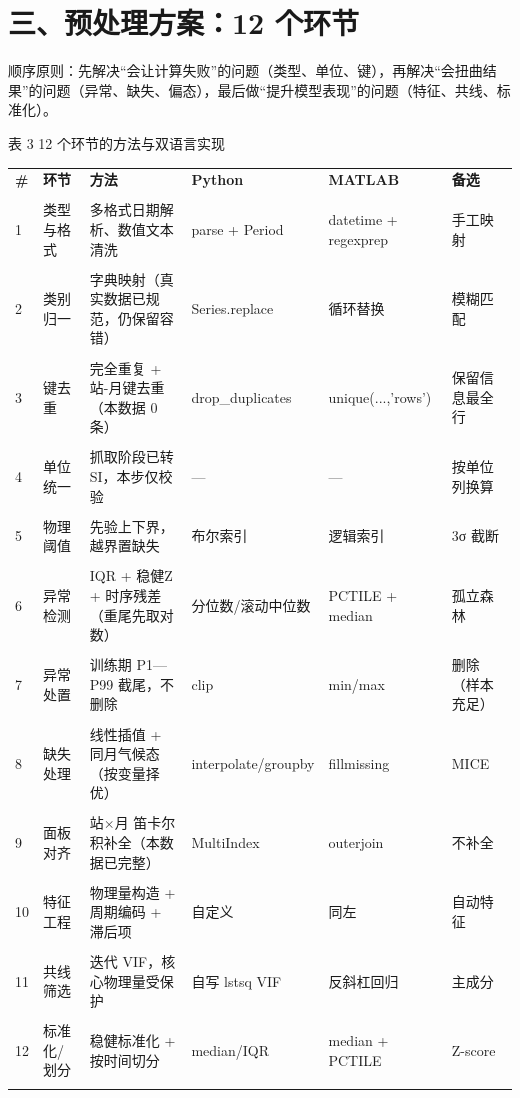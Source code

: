 \documentclass[11pt,a4paper]{ctexart}
\begin{document}
\section*{三、预处理方案：12 个环节}
顺序原则：先解决“会让计算失败”的问题（类型、单位、键），再解决“会扭曲结果”的问题（异常、缺失、偏态），最后做“提升模型表现”的问题（特征、共线、标准化）。

表 3  12 个环节的方法与双语言实现


\begin{table}[H]\centering\small\setlength{\parskip}{2pt}
\begin{tabularx}{\textwidth}{|X|X|X|X|X|X|}
\toprule
\textbf{\#} & \textbf{环节} & \textbf{方法} & \textbf{Python} & \textbf{MATLAB} & \textbf{备选} \\\\
\midrule
1 & 类型与格式 & 多格式日期解析、数值文本清洗 & parse + Period & datetime + regexprep & 手工映射 \\\\
2 & 类别归一 & 字典映射（真实数据已规范，仍保留容错） & Series.replace & 循环替换 & 模糊匹配 \\\\
3 & 键去重 & 完全重复 + 站-月键去重（本数据 0 条） & drop\_duplicates & unique(...,'rows') & 保留信息最全行 \\\\
4 & 单位统一 & 抓取阶段已转 SI，本步仅校验 & — & — & 按单位列换算 \\\\
5 & 物理阈值 & 先验上下界，越界置缺失 & 布尔索引 & 逻辑索引 & 3σ 截断 \\\\
6 & 异常检测 & IQR + 稳健Z + 时序残差（重尾先取对数） & 分位数/滚动中位数 & PCTILE + median & 孤立森林 \\\\
7 & 异常处置 & 训练期 P1—P99 截尾，不删除 & clip & min/max & 删除（样本充足） \\\\
8 & 缺失处理 & 线性插值 + 同月气候态（按变量择优） & interpolate/groupby & fillmissing & MICE \\\\
9 & 面板对齐 & 站$\times$月 笛卡尔积补全（本数据已完整） & MultiIndex & outerjoin & 不补全 \\\\
10 & 特征工程 & 物理量构造 + 周期编码 + 滞后项 & 自定义 & 同左 & 自动特征 \\\\
11 & 共线筛选 & 迭代 VIF，核心物理量受保护 & 自写 lstsq VIF & 反斜杠回归 & 主成分 \\\\
12 & 标准化/划分 & 稳健标准化 + 按时间切分 & median/IQR & median + PCTILE & Z-score \\\\
\bottomrule
\end{tabularx}
\end{table}
\end{document}
